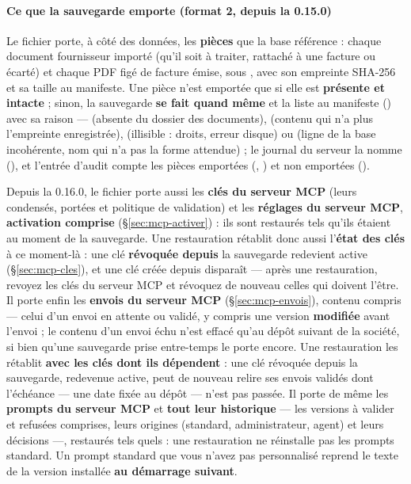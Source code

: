 \documentclass[a4paper,11pt,oneside]{article}
\begin{document}
\paragraph{Ce que la sauvegarde emporte (format 2, depuis la 0.15.0)}

Le fichier porte, à côté des données, les \textbf{pièces} que la base référence : chaque document fournisseur importé (qu'il soit à traiter, rattaché à une facture ou écarté) et chaque PDF figé de facture émise, sous , avec son empreinte SHA-256 et sa taille au manifeste. Une pièce n'est emportée que si elle est \textbf{présente et intacte} ; sinon, la sauvegarde \textbf{se fait quand même} et la liste au manifeste () avec sa raison ---  (absente du dossier des documents),  (contenu qui n'a plus l'empreinte enregistrée),  (illisible : droits, erreur disque) ou  (ligne de la base incohérente, nom qui n'a pas la forme attendue) ; le journal du serveur la nomme (), et l'entrée d'audit  compte les pièces emportées (, ) et non emportées ().

Depuis la 0.16.0, le fichier porte aussi les \textbf{clés du serveur MCP} (leurs condensés, portées et politique de validation) et les \textbf{réglages du serveur MCP}, \textbf{activation comprise} (\S\ref{sec:mcp-activer}) : ils sont restaurés tels qu'ils étaient au moment de la sauvegarde. Une restauration rétablit donc aussi l'\textbf{état des clés} à ce moment-là : une clé \textbf{révoquée depuis} la sauvegarde redevient active (\S\ref{sec:mcp-cles}), et une clé créée depuis disparaît --- après une restauration, revoyez les clés du serveur MCP et révoquez de nouveau celles qui doivent l'être. Il porte enfin les \textbf{envois du serveur MCP} (\S\ref{sec:mcp-envois}), contenu compris --- celui d'un envoi en attente ou validé, y compris une version \textbf{modifiée} avant l'envoi ; le contenu d'un envoi échu n'est effacé qu'au dépôt suivant de la société, si bien qu'une sauvegarde prise entre-temps le porte encore. Une restauration les rétablit \textbf{avec les clés dont ils dépendent} : une clé révoquée depuis la sauvegarde, redevenue active, peut de nouveau relire ses envois validés dont l'échéance --- une date fixée au dépôt --- n'est pas passée. Il porte de même les \textbf{prompts du serveur MCP} et \textbf{tout leur historique} --- les versions à valider et refusées comprises, leurs origines (standard, administrateur, agent) et leurs décisions ---, restaurés tels quels : une restauration ne réinstalle pas les prompts standard. Un prompt standard que vous n'avez pas personnalisé reprend le texte de la version installée \textbf{au démarrage suivant}.
\end{document}
